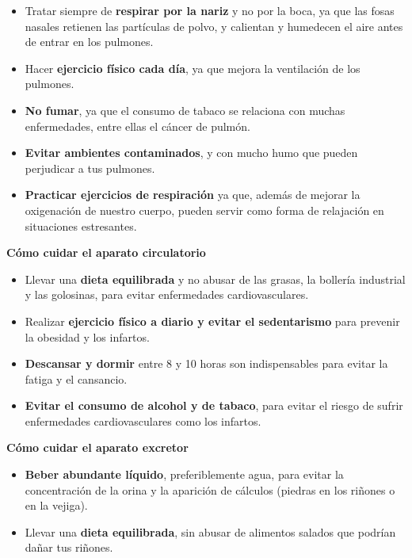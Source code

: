 \begin{itemize}
    \item Tratar siempre de \textbf{respirar por la nariz} y no por la boca, ya que las fosas nasales retienen las partículas de polvo, y calientan y humedecen el aire antes de entrar en los pulmones.
    \item Hacer \textbf{ejercicio físico cada día}, ya que mejora la ventilación de los pulmones.
    \item \textbf{No fumar}, ya que el consumo de tabaco se relaciona con muchas enfermedades, entre ellas el cáncer de pulmón.
    \item \textbf{Evitar ambientes contaminados}, y con mucho humo que pueden perjudicar a tus pulmones.
    \item \textbf{Practicar ejercicios de respiración} ya que, además de mejorar la oxigenación de nuestro cuerpo, pueden servir como forma de relajación en situaciones estresantes.
\end{itemize}

\textbf{Cómo cuidar el aparato circulatorio}

\begin{itemize}
    \item Llevar una \textbf{dieta equilibrada} y no abusar de las grasas, la bollería industrial y las golosinas, para evitar enfermedades cardiovasculares.
    \item Realizar \textbf{ejercicio físico a diario y evitar el sedentarismo} para prevenir la obesidad y los infartos.
    \item \textbf{Descansar y dormir} entre 8 y 10 horas son indispensables para evitar la fatiga y el cansancio.
    \item \textbf{Evitar el consumo de alcohol y de tabaco}, para evitar el riesgo de sufrir enfermedades cardiovasculares como los infartos.
\end{itemize}

\textbf{Cómo cuidar el aparato excretor}

\begin{itemize}
    \item \textbf{Beber abundante líquido}, preferiblemente agua, para evitar la concentración de la orina y la aparición de cálculos (piedras en los riñones o en la vejiga).
    \item Llevar una \textbf{dieta equilibrada}, sin abusar de alimentos salados que podrían dañar tus riñones.
\end{itemize}